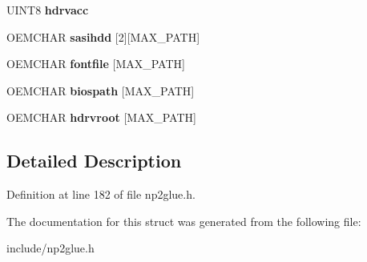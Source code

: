 \begin{DoxyCompactItemize}
\item 
\hypertarget{structNP2CFG_a3fcb7abdb9a79824af6d08d619939bfd}{U\-I\-N\-T8 {\bfseries hdrvacc}}\label{structNP2CFG_a3fcb7abdb9a79824af6d08d619939bfd}

\item 
\hypertarget{structNP2CFG_a10760e7864ee87a272f11d69b443bd9a}{O\-E\-M\-C\-H\-A\-R {\bfseries sasihdd} \mbox{[}2\mbox{]}\mbox{[}M\-A\-X\-\_\-\-P\-A\-T\-H\mbox{]}}\label{structNP2CFG_a10760e7864ee87a272f11d69b443bd9a}

\item 
\hypertarget{structNP2CFG_aad32a36f7c3efd58e91ac63364217251}{O\-E\-M\-C\-H\-A\-R {\bfseries fontfile} \mbox{[}M\-A\-X\-\_\-\-P\-A\-T\-H\mbox{]}}\label{structNP2CFG_aad32a36f7c3efd58e91ac63364217251}

\item 
\hypertarget{structNP2CFG_aa7824b99760945ec89ab24bd58a02f54}{O\-E\-M\-C\-H\-A\-R {\bfseries biospath} \mbox{[}M\-A\-X\-\_\-\-P\-A\-T\-H\mbox{]}}\label{structNP2CFG_aa7824b99760945ec89ab24bd58a02f54}

\item 
\hypertarget{structNP2CFG_a384ccba7ed9a3a5ac5834f2188762322}{O\-E\-M\-C\-H\-A\-R {\bfseries hdrvroot} \mbox{[}M\-A\-X\-\_\-\-P\-A\-T\-H\mbox{]}}\label{structNP2CFG_a384ccba7ed9a3a5ac5834f2188762322}

\end{DoxyCompactItemize}


\subsection{Detailed Description}


Definition at line 182 of file np2glue.\-h.



The documentation for this struct was generated from the following file\-:\begin{DoxyCompactItemize}
\item 
include/np2glue.\-h\end{DoxyCompactItemize}
